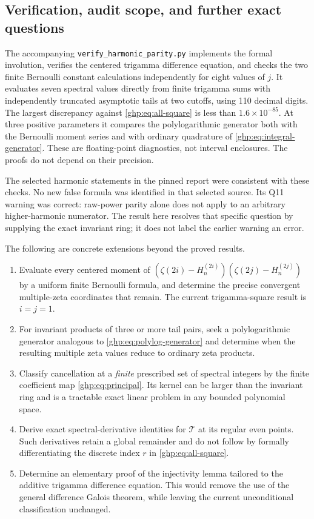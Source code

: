 \documentclass[11pt,a4paper]{article}
\numberwithin{equation}{section}
\theoremstyle{definition}
\theoremstyle{remark}
\begin{document}
\subsection{Verification, audit scope, and further exact questions}

The accompanying \texttt{verify\_harmonic\_parity.py} implements the
formal involution, verifies the centered trigamma difference equation,
and checks the two finite Bernoulli constant calculations independently
for eight values of $j$. It evaluates seven spectral values directly
from finite trigamma sums with independently truncated asymptotic tails
at two cutoffs, using 110 decimal digits. The largest discrepancy
against \eqref{ghp:eq:all-square} is less than $1.6\times10^{-85}$.
At three positive parameters it compares the polylogarithmic generator
both with the Bernoulli moment series and with ordinary quadrature of
\eqref{ghp:eq:integral-generator}. These are floating-point diagnostics,
not interval enclosures. The proofs do not depend on their precision.

The selected harmonic statements in the pinned report were consistent
with these checks. No new false formula was identified in that selected
source. Its Q11 warning was correct: raw-power parity alone does not
apply to an arbitrary higher-harmonic numerator. The result here
resolves that specific question by supplying the exact invariant ring;
it does not label the earlier warning an error.

The following are concrete extensions beyond the proved results.
\begin{enumerate}
\item Evaluate every centered moment of
$(\zeta(2i)-H_n^{(2i)})(\zeta(2j)-H_n^{(2j)})$ by a uniform finite
Bernoulli formula, and determine the precise convergent multiple-zeta
coordinates that remain. The current trigamma-square result is
$i=j=1$.
\item For invariant products of three or more tail pairs, seek a
polylogarithmic generator analogous to \eqref{ghp:eq:polylog-generator}
and determine when the resulting multiple zeta values reduce to
ordinary zeta products.
\item Classify cancellation at a \emph{finite} prescribed set of
spectral integers by the finite coefficient map
\eqref{ghp:eq:principal}. Its kernel can be larger than the invariant
ring and is a tractable exact linear problem in any bounded polynomial
space.
\item Derive exact spectral-derivative identities for $\mathcal T$
at its regular even points. Such derivatives retain a global remainder
and do not follow by formally differentiating the discrete index $r$
in \eqref{ghp:eq:all-square}.
\item Determine an elementary proof of the injectivity lemma tailored
to the additive trigamma difference equation. This would remove the
use of the general difference Galois theorem, while leaving the current
unconditional classification unchanged.
\end{enumerate}
\end{document}
